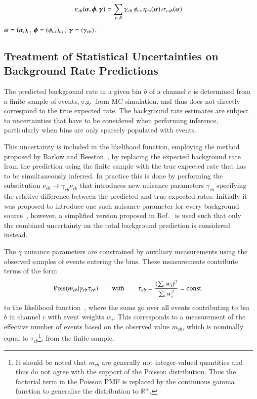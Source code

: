 \begin{align*}
  \nu_{cb}(\boldalpha, \boldphi, \boldgamma) = \sum_{s \in \mathcal{S}} \gamma_{cb} \, \phi_{cs} \, \eta_{cs}(\boldalpha) \, \sigma_{csb}(\boldalpha)
\end{align*}
$\boldalpha = (\alpha_i)_i$, $\boldphi = (\phi_{cs})_{cs}$,
$\boldgamma = (\gamma_{cb})$.




\subsection{Treatment of Statistical Uncertainties on Background Rate
  Predictions}%
\label{sec:barlow_beeston}

The predicted background rate in a given bin $b$ of a channel $c$ is
determined from a finite sample of events, e.g.\ from MC simulation,
and thus does not directly correspond to the true expected rate. The
background rate estimates are subject to uncertainties that have to be
considered when performing inference, particularly when bins are only
sparsely populated with events.

This uncertainty is included in the likelihood function, employing the
method proposed by Barlow and Beeston~\cite{barlow1993}, by replacing
the expected background rate from the prediction using the finite
sample with the true expected rate that has to be simultaneously
inferred. In practice this is done by performing the substitution
$\nu_{cb} \rightarrow \gamma_{cb} \nu_{cb}$ that introduces new
nuisance parameters $\gamma_{cb}$ specifying the relative difference
between the predicted and true expected rates. Initially it was
proposed to introduce one such nuisance parameter for every background
source~\cite{barlow1993}, however, a simplified version proposed in
Ref.~\cite{conway2011} is used such that only the combined uncertainty
on the total background prediction is considered instead.

The $\gamma$ nuisance parameters are constrained by auxiliary
measurements using the observed samples of events entering the
bins. These measurements contribute terms of the form
\begin{align*}
  \operatorname{Pois}(m_{cb} | \gamma_{cb} \tau_{cb})
  \qquad \text{with} \qquad
  \tau_{cb} = \frac{( \sum_i w_i )^2}{\sum_i w_i^2} = \text{const.}
\end{align*}
to the likelihood function~\cite{cranmer2012}, where the sums go over
all events contributing to bin $b$ in channel $c$ with event weights
$w_i$. This corresponds to a measurement of the effective number of
events based on the observed value $m_{cb}$, which is nominally equal
to $\tau_{cb}$\footnote{It should be noted that $m_{cb}$ are generally
  not integer-valued quantities and thus do not agree with the support
  of the Poisson distribution. Thus the factorial term in the Poisson
  PMF is replaced by the continuous gamma function to generalise the
  distribution to $\mathbb{R}^+$.}, from the finite sample.

